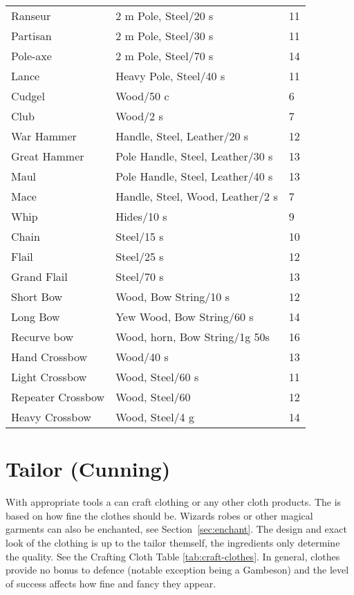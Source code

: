 \documentclass[a4paper,11pt,oneside]{book}
\newcommand{\textlf}[1]{\textbf{\titlecap{#1}}}
\begin{document}
\begin{table}[!ht]
\begin{tabular}{|l|l|l|}
    Ranseur & 2 m Pole, Steel/20 s & 11\\
    Partisan & 2 m Pole, Steel/30 s & 11\\
    Pole-axe & 2 m Pole, Steel/70 s & 14\\
    Lance & Heavy Pole, Steel/40 s & 11\\
    \hline
    Cudgel & Wood/50 c & 6\\
    Club & Wood/2 s & 7\\
    War Hammer & Handle, Steel, Leather/20 s & 12 \\
    Great Hammer & Pole Handle, Steel, Leather/30 s & 13 \\
    Maul & Pole Handle, Steel, Leather/40 s & 13 \\
    Mace & Handle, Steel, Wood, Leather/2 s & 7 \\
    \hline
    Whip & Hides/10 s & 9\\
    Chain & Steel/15 s & 10\\
    Flail & Steel/25 s & 12\\   
    Grand Flail & Steel/70 s & 13\\ 
    \hline
    Short Bow & Wood, Bow String/10 s & 12\\
    Long Bow & Yew Wood, Bow String/60 s & 14\\
    Recurve bow & Wood, horn, Bow String/1g 50s & 16 \\
    \hline
    Hand Crossbow & Wood/40 s & 13 \\ 
    Light Crossbow & Wood, Steel/60 s & 11\\
    Repeater Crossbow & Wood, Steel/60 & 12 \\
    Heavy Crossbow & Wood, Steel/4 g & 14\\
    \hline
    \end{tabular}
\end{table}



\section{Tailor (Cunning)}
With appropriate tools a \textlf{Tailor} can craft clothing or any other cloth products. The \textlf{difficulty} is based on how fine the clothes should be. Wizards robes or other magical garments can also be enchanted, see Section~\ref{sec:enchant}. The design and exact look of the clothing is up to the tailor themself, the ingredients only determine the quality. See the Crafting Cloth Table \ref{tab:craft-clothes}. In general, clothes provide no bonus to defence (notable exception being a Gambeson) and the level of success affects how fine and fancy they appear.
\end{document}
